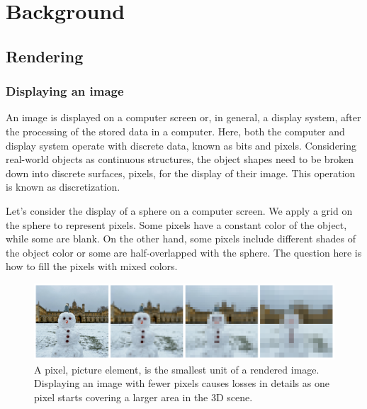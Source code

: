 \chapter{Background}

\section{Rendering}
\subsection{Displaying an image}
An image is displayed on a computer screen or, in general, a display system, after the processing of the stored data in a computer. Here, both the computer and display system operate with discrete data, known as bits and pixels. Considering real-world objects as continuous structures, the object shapes need to be broken down into discrete surfaces, pixels, for the display of their image. This operation is known as discretization. 

Let's consider the display of a sphere on a computer screen. We apply a grid on the sphere to represent pixels. Some pixels have a constant color of the object, while some are blank. On the other hand, some pixels include different shades of the object color or some are half-overlapped with the sphere. The question here is how to fill the pixels with mixed colors. 


\begin{figure}
  \centering

    \includegraphics[width=\linewidth]{Images/pixelate_image_snowman.png}

   \caption{A pixel, picture element, is the smallest unit of a rendered image. Displaying an image with fewer pixels causes losses in details as one pixel starts covering a larger area in the 3D scene.}
   \label{fig:color-approximate}
\end{figure}


